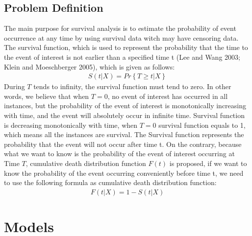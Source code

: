 \documentclass[conference]{IEEEconf}
\begin{document}
\subsection{Problem Definition}
The main purpose for survival analysis is to estimate the probability of event occurrence at any time by using survival data witch may have censoring data. The survival function, which is used to represent the probability that the time to the event of interest is not earlier than a specified time t (Lee and Wang 2003; Klein and Moeschberger 2005), which is given as follows:
\begin{eqnarray}
	S(t|X) = Pr\left \{T\ge t|X\right \}
\end{eqnarray}
During $T$ tends to infinity, the survival function must tend to zero. In other words, we believe that when $T=0$, no event of interest has occurred in all instances, but the probability of the event of interest is monotonically increasing with time, and the event will absolutely occur in infinite time. Survival function is decreasing monotonically with time, when $T=0$ survival function equals to 1, which means all the instances are survival. The Survival function represents the probability that the event will not occur after time t. On the contrary, because what we want to know is the probability of the event of interest occurring at Time $T$, cumulative death distribution function $F(t)$ is proposed, if we want to know the probability of the event occurring conveniently before time t, we need to use the following formula as cumulative death distribution function:
\begin{eqnarray}
	F(t|X) = 1 - S(t|X)
\end{eqnarray}

\section{Models}
\end{document}
